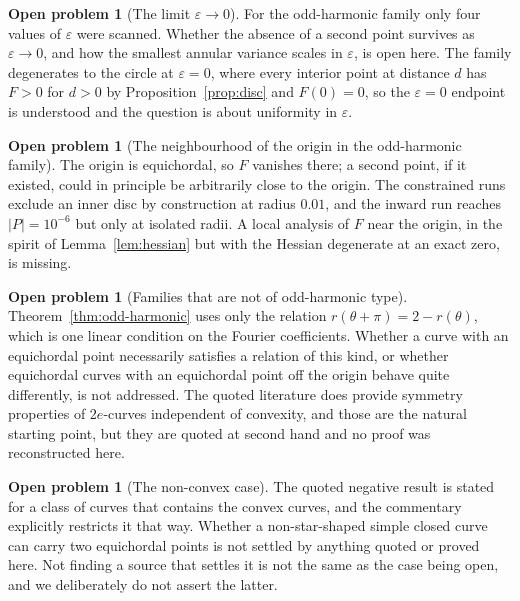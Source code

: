 \documentclass[11pt]{article}
\theoremstyle{definition}
\newtheorem{problem}[theorem]{Open problem}
\theoremstyle{remark}
\begin{document}
\begin{problem}[The limit $\varepsilon\to0$]\label{prob:eps}
For the odd-harmonic family only four values of $\varepsilon$ were scanned. Whether the absence of a second point
survives as $\varepsilon\to0$, and how the smallest annular variance scales in $\varepsilon$, is open here. The
family degenerates to the circle at $\varepsilon=0$, where every interior point at distance $d$ has
$F>0$ for $d>0$ by Proposition~\ref{prop:disc} and $F(0)=0$, so the $\varepsilon=0$ endpoint is understood and the
question is about uniformity in $\varepsilon$.
\end{problem}

\begin{problem}[The neighbourhood of the origin in the odd-harmonic family]\label{prob:origin}
The origin is equichordal, so $F$ vanishes there; a second point, if it existed, could in principle be arbitrarily
close to the origin. The constrained runs exclude an inner disc by construction at radius $0.01$, and the inward
run reaches $|P|=10^{-6}$ but only at isolated radii. A local analysis of $F$ near the origin, in the spirit of
Lemma~\ref{lem:hessian} but with the Hessian degenerate at an exact zero, is missing.
\end{problem}

\begin{problem}[Families that are not of odd-harmonic type]\label{prob:families}
Theorem~\ref{thm:odd-harmonic} uses only the relation $r(\theta+\pi)=2-r(\theta)$, which is one linear condition
on the Fourier coefficients. Whether a curve with an equichordal point necessarily satisfies a relation of this
kind, or whether equichordal curves with an equichordal point off the origin behave quite differently, is not
addressed. The quoted literature does provide symmetry properties of $2e$-curves independent of convexity, and
those are the natural starting point, but they are quoted at second hand and no proof was reconstructed here.
\end{problem}

\begin{problem}[The non-convex case]\label{prob:nonconvex}
The quoted negative result is stated for a class of curves that contains the convex curves, and the commentary
explicitly restricts it that way. Whether a non-star-shaped simple closed curve can carry two equichordal points
is not settled by anything quoted or proved here. Not finding a source that settles it is not the same as the
case being open, and we deliberately do not assert the latter.
\end{problem}
\end{document}
